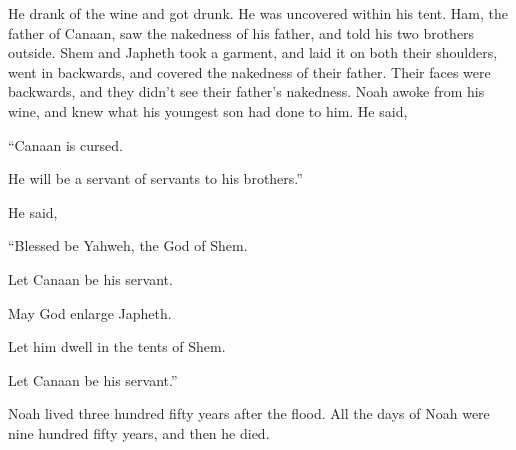 {He drank of the wine and got drunk. He was uncovered within his tent.
Ham, the father of Canaan, saw the nakedness of his father, and told his two brothers outside.
Shem and Japheth took a garment, and laid it on both their shoulders, went in backwards, and covered the nakedness of their father. Their faces were backwards, and they didn’t see their father’s nakedness.
Noah awoke from his wine, and knew what his youngest son had done to him.
He said,
\par }{\Q “Canaan is cursed.
\par }{\QB He will be a servant of servants to his brothers.”
\par }{\PP {}He said,
\par }{\Q “Blessed be Yahweh, the God of Shem.
\par }{\QB Let Canaan be his servant.
\par }{\Q {}May God enlarge Japheth.
\par }{\QB Let him dwell in the tents of Shem.
\par }{\QB Let Canaan be his servant.”
\par }{\PP {}Noah lived three hundred fifty years after the flood.
All the days of Noah were nine hundred fifty years, and then he died.

}
